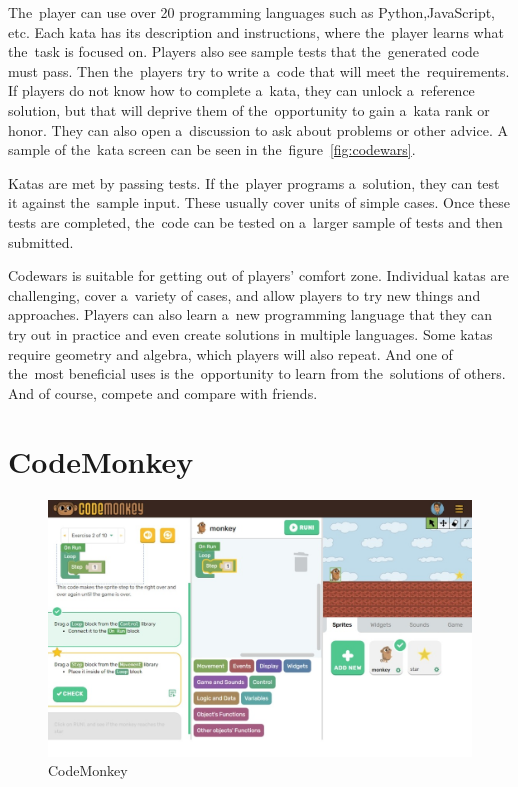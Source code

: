 The~player can use over 20 programming languages such as Python,\linebreak{}JavaScript, etc.
Each kata has its description and instructions, where the~player learns what the~task is focused on.
Players also see sample tests that the~generated code must pass.
Then the~players try to write a~code that will meet the~requirements.
If players do not know how to complete a~kata, they can unlock a~reference solution, but that will deprive them of the~opportunity to gain a~kata rank or honor.
They can also open a~discussion to ask about problems or other advice.
A sample of the~kata screen can be seen in the~figure~\ref{fig:codewars}.

\pagebreak
Katas are met by passing tests.
If the~player programs a~solution, they can test it against the~sample input.
These usually cover units of simple cases.
Once these tests are completed, the~code can be tested on a~larger sample of tests and then submitted.

Codewars is suitable for getting out of players' comfort zone.
Individual katas are challenging, cover a~variety of cases, and allow players to try new things and approaches.
Players can also learn a~new programming language that they can try out in practice and even create solutions in multiple languages.
Some katas require geometry and algebra, which players will also repeat.
And one of the~most beneficial uses is the~opportunity to learn from the~solutions of others.
And of course, compete and compare with friends. 

\section{CodeMonkey}

\begin{figure}
    \centering
    \includegraphics[width=1\linewidth]{assets/similar-games/codemonkey.jpeg}
    \caption{CodeMonkey~\cite{a2020_codemonkey}}
    \label{fig:codemonkey}
\end{figure}

